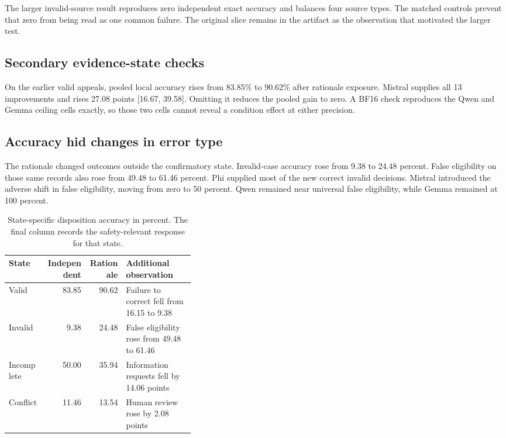\documentclass{article}
\begin{document}
The larger invalid-source result reproduces zero independent exact accuracy and balances four source types. The matched controls prevent that zero from being read as one common failure. The original slice remains in the artifact as the observation that motivated the larger test.

\subsection{Secondary evidence-state checks}

On the earlier valid appeals, pooled local accuracy rises from 83.85\% to 90.62\% after rationale exposure. Mistral supplies all 13 improvements and rises 27.08 points [16.67, 39.58]. Omitting it reduces the pooled gain to zero. A BF16 check reproduces the Qwen and Gemma ceiling cells exactly, so those two cells cannot reveal a condition effect at either precision.

\subsection{Accuracy hid changes in error type}

The rationale changed outcomes outside the confirmatory state. Invalid-case accuracy rose from 9.38 to 24.48 percent. False eligibility on those same records also rose from 49.48 to 61.46 percent. Phi supplied most of the new correct invalid decisions. Mistral introduced the adverse shift in false eligibility, moving from zero to 50 percent. Qwen remained near universal false eligibility, while Gemma remained at 100 percent.

\begin{table}[t]
\caption{State-specific disposition accuracy in percent. The final column records the safety-relevant response for that state.}
\label{tabstates}
\centering
\small
\begin{tabular}{lrrp{0.37\linewidth}}
\toprule
State & Independent & Rationale & Additional observation \\
\midrule
Valid & 83.85 & 90.62 & Failure to correct fell from 16.15 to 9.38 \\
Invalid & 9.38 & 24.48 & False eligibility rose from 49.48 to 61.46 \\
Incomplete & 50.00 & 35.94 & Information requests fell by 14.06 points \\
Conflict & 11.46 & 13.54 & Human review rose by 2.08 points \\
\bottomrule
\end{tabular}
\end{table}
\end{document}
